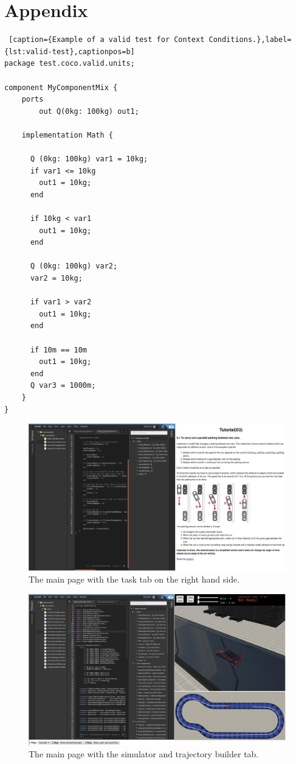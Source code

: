 \chapter{Appendix}
\begin{lstlisting} [caption={Example of a valid test for Context Conditions.},label={lst:valid-test},captionpos=b]
package test.coco.valid.units;

component MyComponentMix {
    ports
        out Q(0kg: 100kg) out1;
        
    implementation Math {

      Q (0kg: 100kg) var1 = 10kg;
      if var1 <= 10kg
        out1 = 10kg;
      end

      if 10kg < var1
        out1 = 10kg;
      end
      
      Q (0kg: 100kg) var2;
      var2 = 10kg;
      
      if var1 > var2
        out1 = 10kg;
      end
      
      if 10m == 10m
        out1 = 10kg;
      end
      Q var3 = 1000m;
    }
}
\end{lstlisting}
\newpage
\begin{figure}
    \centering
    \includegraphics[width=\linewidth]{src/pic/web-interface-task}
    \caption{The main page with the task tab on the right hand side.}
    \label{fig:web-interface-task}
\end{figure}
\begin{figure}
    \centering
    \includegraphics[width=\linewidth]{src/pic/web-interface}
    \caption{The main page with the simulator and trajectory builder tab.}
    \label{fig:web-interface}
\end{figure}
\cleardoublepage
